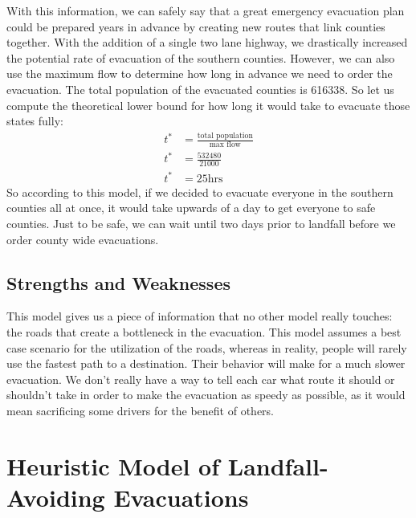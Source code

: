 \documentclass[titlepage]{article}
\begin{document}
    With this information, we can safely say that a great emergency evacuation plan could be prepared years in advance by creating new routes that link counties together. With the addition of a single two lane highway, we drastically increased the potential rate of evacuation of the southern counties. However, we can also use the maximum flow to determine how long in advance we need to order the evacuation.
    The total population of the evacuated counties is 616338. So let us compute the theoretical lower bound for how long it would take to evacuate those states fully:
    \begin{align*}
        t^* &= \frac{\text{total population}}{\text{max flow}}\\
        t^* &= \frac{532480}{21000}\\
        t^* &= 25 \text{hrs}
    \end{align*}
    So according to this model, if we decided to evacuate everyone in the southern counties all at once, it would take upwards of a day to get everyone to safe counties. Just to be safe, we can wait until two days prior to landfall before we order county wide evacuations.
  \subsection{Strengths and Weaknesses}
    This model gives us a piece of information that no other model really touches: the roads that create a bottleneck in the evacuation. %
    This model assumes a best case scenario for the utilization of the roads, whereas in reality, people will rarely use the fastest path to a destination. Their behavior will make for a much slower evacuation. We don't really have a way to tell each car what route it should or shouldn't take in order to make the evacuation as speedy as possible, as it would mean sacrificing some drivers for the benefit of others.

\section{Heuristic Model of Landfall-Avoiding Evacuations}
\label{sec:heuristic}
\end{document}
